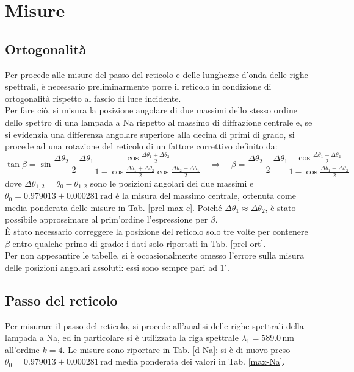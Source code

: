 \documentclass[]{article}
\let\oldsection\section%
\renewcommand{\section}{%
	\renewcommand{\theequation}{\thesection.\arabic{equation}}%
	\oldsection}%
\let\oldsubsection\subsection%
\renewcommand{\subsection}{%
	\renewcommand{\theequation}{\thesubsection.\arabic{equation}}%
	\oldsubsection}%
\begin{document}
    \section{Misure}
    \label{par:misure}

    \subsection{Ortogonalità}
    Per procede alle misure del passo del reticolo e delle lunghezze d'onda delle righe spettrali, è necessario preliminarmente porre il reticolo in condizione di ortogonalità rispetto al fascio di luce incidente. \\
    Per fare ciò, si misura la posizione angolare di due massimi dello stesso ordine dello spettro di una lampada a Na rispetto al massimo di diffrazione centrale e, se si evidenzia una differenza angolare superiore alla decina di primi di grado, si procede ad una rotazione del reticolo di un fattore correttivo definito da:
    \begin{equation}
        \label{beta}
        \tan{\beta} = \sin{\frac{\Delta\theta_2 - \Delta\theta_1}{2}} \frac{\cos{\frac{\Delta\theta_1 + \Delta\theta_2}{2}}}{1 - \cos{\frac{\Delta\theta_1 + \Delta\theta_2}{2}} \cos{\frac{\Delta\theta_2 - \Delta\theta_1}{2}}} \quad\Longrightarrow\quad
        \beta = \frac{\Delta\theta_2 - \Delta\theta_1}{2} \frac{\cos{\frac{\Delta\theta_1 + \Delta\theta_2}{2}}}{1 - \cos{\frac{\Delta\theta_1 + \Delta\theta_2}{2}}}
    \end{equation}
    dove $\Delta\theta_{1,2} = \theta_0 - \theta_{1,2}$ sono le posizioni angolari dei due massimi e $\theta_0 = 0.979013 \pm 0.000281 \,\text{rad}$ è la misura del massimo centrale, ottenuta come media ponderata delle misure in Tab. \ref{prel-max-c}. Poiché $\Delta\theta_1 \approx \Delta\theta_2$, è stato possibile approssimare al prim'ordine l'espressione per $\beta$. \\
    È stato necessario correggere la posizione del reticolo solo tre volte per contenere $\beta$ entro qualche primo di grado: i dati solo riportati in Tab. \ref{prel-ort}. \\
    Per non appesantire le tabelle, si è occasionalmente omesso l'errore sulla misura delle posizioni angolari assoluti: essi sono sempre pari ad $1'$.

    \subsection{Passo del reticolo}
    Per misurare il passo del reticolo, si procede all'analisi delle righe spettrali della lampada a Na, ed in particolare si è utilizzata la riga spettrale $\lambda_1 = 589.0\,\text{nm}$ all'ordine $k=4$. Le misure sono riportare in Tab. \ref{d-Na}: si è di nuovo preso $\theta_0 = 0.979013 \pm 0.000281 \,\text{rad}$ media ponderata dei valori in Tab. \ref{max-Na}.
\end{document}
